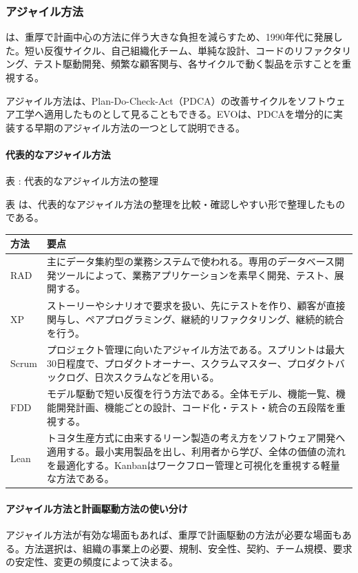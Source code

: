 \subsubsection{アジャイル方法}
は、重厚で計画中心の方法に伴う大きな負担を減らすため、1990年代に発展した。短い反復サイクル、自己組織化チーム、単純な設計、コードのリファクタリング、テスト駆動開発、頻繁な顧客関与、各サイクルで動く製品を示すことを重視する。

アジャイル方法は、Plan-Do-Check-Act（PDCA）の改善サイクルをソフトウェア工学へ適用したものとして見ることもできる。EVOは、PDCAを増分的に実装する早期のアジャイル方法の一つとして説明できる。

\paragraph{代表的なアジャイル方法}
\par\smallskip\noindent{}\label{tab:ch11-08}表 \thetable: 代表的なアジャイル方法の整理\par\smallskip
表 \thetable は、代表的なアジャイル方法の整理を比較・確認しやすい形で整理したものである。\par\smallskip
\begin{longtable}{>{\raggedright\arraybackslash}p{}>{\raggedright\arraybackslash}p{}}
\toprule
方法 & 要点 \\
\midrule
RAD & 主にデータ集約型の業務システムで使われる。専用のデータベース開発ツールによって、業務アプリケーションを素早く開発、テスト、展開する。\\
XP & ストーリーやシナリオで要求を扱い、先にテストを作り、顧客が直接関与し、ペアプログラミング、継続的リファクタリング、継続的統合を行う。\\
Scrum & プロジェクト管理に向いたアジャイル方法である。スプリントは最大30日程度で、プロダクトオーナー、スクラムマスター、プロダクトバックログ、日次スクラムなどを用いる。\\
FDD & モデル駆動で短い反復を行う方法である。全体モデル、機能一覧、機能開発計画、機能ごとの設計、コード化・テスト・統合の五段階を重視する。\\
Lean & トヨタ生産方式に由来するリーン製造の考え方をソフトウェア開発へ適用する。最小実用製品を出し、利用者から学び、全体の価値の流れを最適化する。Kanbanはワークフロー管理と可視化を重視する軽量な方法である。\\
\bottomrule
\end{longtable}

\paragraph{アジャイル方法と計画駆動方法の使い分け}
アジャイル方法が有効な場面もあれば、重厚で計画駆動の方法が必要な場面もある。方法選択は、組織の事業上の必要、規制、安全性、契約、チーム規模、要求の安定性、変更の頻度によって決まる。

